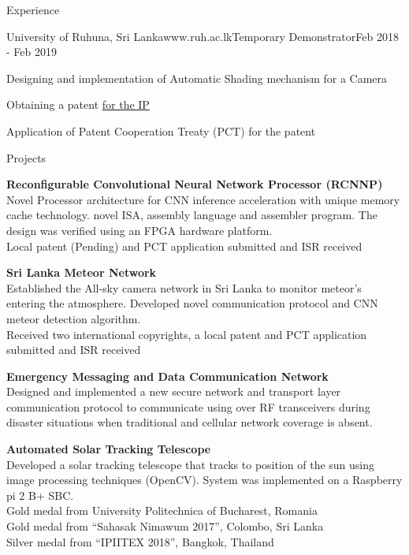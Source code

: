 \documentclass[
	11pt, %
]{./assets/resume} %
\begin{document}
\begin{rSection}{Experience}

	\begin{rSubsectionX}{University of Ruhuna, Sri Lanka}{www.ruh.ac.lk}{Temporary Demonstrator}{Feb 2018 - Feb 2019}
		\item Designing and implementation of Automatic Shading mechanism for a Camera
		\item Obtaining a patent \href{https://patentscope.wipo.int/search/en/detail.jsf?docId=WO2021069993&_cid=P20-LSKB9J-42754-1}{for the IP}
		\item Application of Patent Cooperation Treaty (PCT) for the patent 
	\end{rSubsectionX}

\end{rSection}


\begin{rSection}{Projects}

	\textbf{Reconfigurable Convolutional Neural Network Processor (RCNNP)} \\
	Novel Processor architecture for CNN inference acceleration with unique memory cache technology. novel ISA, assembly language and assembler program. The design was verified using an FPGA hardware platform. \\ 
	Local patent (Pending) and PCT application submitted and ISR received 


	\textbf{Sri Lanka Meteor Network} \\
	Established the All-sky camera network in Sri Lanka to monitor meteor's entering the atmosphere.
	Developed novel communication protocol and CNN meteor detection algorithm.\\
	Received two international copyrights, a local patent and PCT application submitted and ISR received 

	\textbf{Emergency Messaging and Data Communication Network} \\
	Designed and implemented a new secure network and transport layer communication protocol to communicate using over RF transceivers during disaster situations when traditional and cellular network coverage is absent.

	\textbf{Automated Solar Tracking Telescope} \\
	Developed a solar tracking telescope that tracks to position of the sun using image processing techniques (OpenCV). System was implemented on a Raspberry pi 2 B+ SBC. \\
	Gold medal from University Politechnica of Bucharest, Romania \\
	Gold medal from “Sahasak Nimawum 2017”, Colombo, Sri Lanka \\
	Silver medal from “IPIITEX 2018”, Bangkok, Thailand

\end{rSection}
\end{document}
